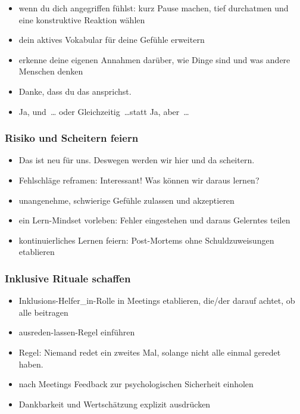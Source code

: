 \begin{itemize}
  \item wenn du dich angegriffen fühlst: kurz Pause machen, tief durchatmen und eine konstruktive Reaktion wählen
  \item dein aktives Vokabular für deine Gefühle erweitern
  \item erkenne deine eigenen Annahmen darüber, wie Dinge sind und was andere Menschen denken 
  \item \glqq Danke, dass du das ansprichst.\grqq {}
  \item \glqq Ja, und~\ldots\grqq{} oder \glqq Gleichzeitig~\ldots\grqq statt \glqq Ja, aber~\ldots\grqq {}
\end{itemize}


\subsubsection{Risiko und Scheitern feiern}

\begin{itemize}
  \item \glqq Das ist neu für uns. Deswegen werden wir hier und da scheitern.\grqq
  \item Fehlschläge reframen: \glqq Interessant! Was können wir daraus lernen?\grqq {} 
  \item unangenehme, schwierige Gefühle zulassen und akzeptieren 
  \item ein Lern-Mindset vorleben: Fehler eingestehen und daraus Gelerntes teilen 
  \item kontinuierliches Lernen feiern: Post-Mortems ohne Schuldzuweisungen etablieren  
\end{itemize}


\subsubsection{Inklusive Rituale schaffen}

\begin{itemize}
  \item \glqq Inklusions-Helfer\_in\grqq-Rolle in Meetings etablieren, die/der darauf achtet, ob alle beitragen 
  \item \glqq ausreden-lassen\grqq-Regel einführen 
  \item Regel: \glqq Niemand redet ein zweites Mal, solange nicht alle einmal geredet haben.\grqq
  \item nach Meetings Feedback zur psychologischen Sicherheit einholen
  \item Dankbarkeit und Wertschätzung explizit ausdrücken  
\end{itemize}
